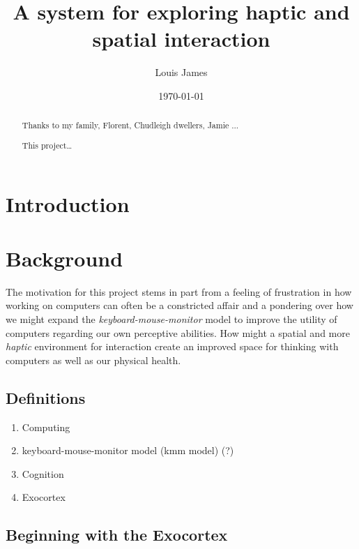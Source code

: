 \documentclass[12pt]{report}
\author{Louis James}
\date{\today}
\title{A system for exploring haptic and spatial interaction}
\begin{document}
\maketitle

\renewcommand{\abstractname}{Acknowledgements}
\begin{abstract}
 Thanks to my family, Florent, Chudleigh dwellers, Jamie ...
\end{abstract}
\newpage


\renewcommand{\abstractname}{Abstract}
\begin{abstract}
This project\ldots{}
\end{abstract}
\tableofcontents
\listoffigures
\chapter{Introduction}
\label{sec:org85610d0}
\chapter{Background}
\label{sec:org93b1bb4}

The motivation for this project stems in part from a feeling of frustration in
how working on computers can often be a constricted affair and a pondering over
how we might expand the \emph{keyboard-mouse-monitor} model to improve the utility of
computers regarding our own perceptive abilities. How might a spatial and more
\emph{haptic} environment for interaction create an improved space for thinking with
computers as well as our physical health.

\section{Definitions}
\label{sec:org2de35ae}
\begin{enumerate}
\item Computing
\label{sec:org33f37f1}
\item keyboard-mouse-monitor model (kmm model) (?)
\label{sec:orgea8c6c9}
\item Cognition
\label{sec:org923dbe6}
\item Exocortex
\label{sec:org082513e}
\end{enumerate}

\section{Beginning with the Exocortex}
\label{sec:org5e36fa9}
\end{document}
